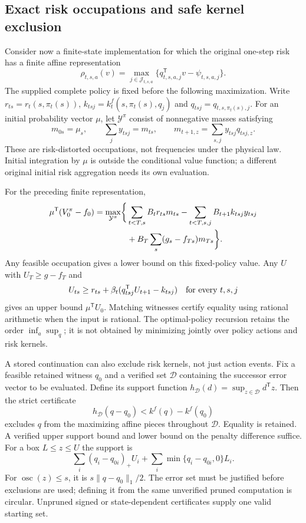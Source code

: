 \subsection{Exact risk occupations and safe kernel exclusion}
Consider now a finite-state implementation for which the original one-step risk has a finite affine representation
\[
 \rho_{t,s,a}(v)=\max_{j\in\mathcal J_{t,s,a}}
       \{q_{t,s,a,j}^{\mathsf T}v-\psi_{t,s,a,j}\}.
\]
The supplied complete policy is fixed before the following maximization. Write $r_{ts}=r_t(s,\pi_t(s))$, $k_{tsj}=k_t^f(s,\pi_t(s),q_j)$ and $q_{tsj}=q_{t,s,\pi_t(s),j}$. For an initial probability vector $\mu$, let $\mathcal Y^\pi$ consist of nonnegative masses satisfying
\begin{equation}\label{eq:riskflow92}
 m_{0s}=\mu_s,\qquad \sum_j y_{tsj}=m_{ts},\qquad
 m_{t+1,z}=\sum_{s,j}y_{tsj}q_{tsj,z}.
\end{equation}
These are risk-distorted occupations, not frequencies under the physical law. Initial integration by $\mu$ is outside the conditional value function; a different original initial risk aggregation needs its own evaluation.

\begin{proposition}\label{prop:riskflow92}
For the preceding finite representation,
\begin{align}\label{eq:riskflow-value92}
 \mu^{\mathsf T}(V_0^\pi-f_0)
 =\max_{\mathcal Y^\pi}\biggl\{
 &\sum_{t<T,s}B_t r_{ts}m_{ts}
 -\sum_{t<T,s,j}B_{t+1}k_{tsj}y_{tsj}\notag\\
 &+B_T\sum_s(g_s-f_{Ts})m_{Ts}\biggr\}.
\end{align}
Any feasible occupation gives a lower bound on this fixed-policy value. Any $U$ with $U_T\ge g-f_T$ and
\[
 U_{ts}\ge r_{ts}+\beta_t(q_{tsj}^{\mathsf T}U_{t+1}-k_{tsj})
 \quad\hbox{for every }t,s,j
\]
gives an upper bound $\mu^{\mathsf T}U_0$. Matching witnesses certify equality using rational arithmetic when the input is rational. The optimal-policy recursion retains the order $\inf_a\sup_q$; it is not obtained by minimizing jointly over policy actions and risk kernels.
\end{proposition}

A stored continuation can also exclude risk kernels, not just action events. Fix a feasible retained witness $q_0$ and a verified set $\mathcal D$ containing the successor error vector to be evaluated. Define its support function $h_{\mathcal D}(d)=\sup_{z\in\mathcal D}d^{\mathsf T}z$. Then the strict certificate
\begin{equation}\label{eq:kernel-cut92}
 h_{\mathcal D}(q-q_0)<k^f(q)-k^f(q_0)
\end{equation}
excludes $q$ from the maximizing affine pieces throughout $\mathcal D$. Equality is retained. A verified upper support bound and lower bound on the penalty difference suffice. For a box $L\le z\le U$ the support is
\[
 \sum_i(q_i-q_{0i})_+U_i
       +\sum_i\min\{q_i-q_{0i},0\}L_i.
\]
For $\operatorname{osc}(z)\le s$, it is $s\|q-q_0\|_1/2$. The error set must be justified before exclusions are used; defining it from the same unverified pruned computation is circular. Unpruned signed or state-dependent certificates supply one valid starting set.

